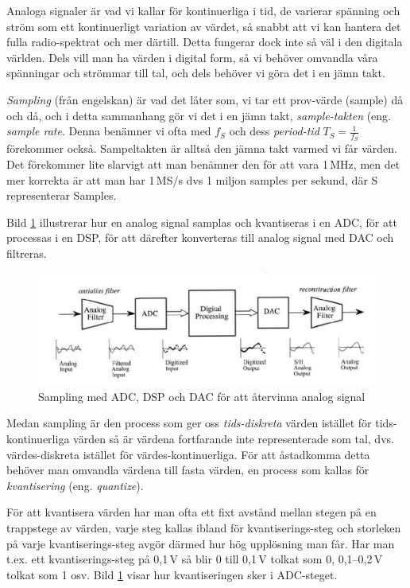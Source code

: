 Analoga signaler är vad vi kallar för kontinuerliga i tid, de varierar spänning
och ström som ett kontinuerligt variation av värdet, så snabbt att vi kan
hantera det fulla radio-spektrat och mer därtill.
Detta fungerar dock inte så väl i den digitala världen.
Dels vill man ha värden i digital form, så vi behöver omvandla våra spänningar
och strömmar till tal, och dels behöver vi göra det i en jämn takt.

\emph{Sampling} (från engelskan) är vad det låter som, vi tar ett prov-värde
(sample) då och då, och i detta sammanhang gör vi det i en jämn takt,
\emph{sample-takten} (eng. \emph{sample rate}.
Denna benämner vi ofta med \(f_S\) och dess \emph{period-tid}
\(T_S=\frac{1}{f_S}\) förekommer också.
Sampeltakten är alltså den jämna takt varmed vi får värden.
Det förekommer lite slarvigt att man benämner den för att vara 1\,MHz, men det
mer korrekta är att man har 1\,MS/s dvs 1 miljon samples per sekund, där S
representerar Samples.

Bild \ref{fig:BildII1-37} illustrerar hur en analog signal samplas och
kvantiseras i en ADC, för att processas i en DSP, för att därefter konverteras
till analog signal med DAC och filtreras.

\begin{figure}
	\begin{center}
		\includegraphics[width=\textwidth]{images/cropped_pdfs/bild_2_1-37.pdf}
		\caption{Sampling med ADC, DSP och DAC för att återvinna analog signal}
		\label{fig:BildII1-37}
	\end{center}
\end{figure}

Medan sampling är den process som ger oss \emph{tids-diskreta} värden istället
för tids-kontinuerliga värden så är värdena fortfarande inte representerade som
tal, dvs. värdes-diskreta istället för värdes-kontinuerliga.
För att åstadkomma detta behöver man omvandla värdena till fasta värden, en
process som kallas för \emph{kvantisering} (eng. \emph{quantize}).

För att kvantisera värden har man ofta ett fixt avstånd mellan stegen på en
trappstege av värden, varje steg kallas ibland för kvantiserings-steg och
storleken på varje kvantiserings-steg avgör därmed hur hög upplösning man får.
Har man t.ex. ett kvantiserings-steg på 0,1\,V så blir 0 till 0,1\,V tolkat som
0, 0,1--0,2\,V tolkat som 1 osv.
Bild \ref{fig:BildII1-37} visar hur kvantiseringen sker i ADC-steget.


